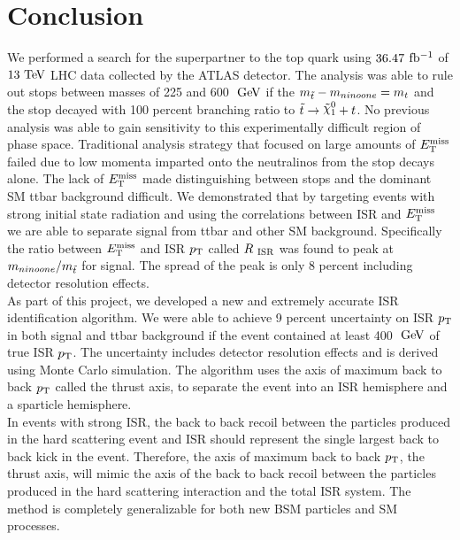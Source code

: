\chapter{Conclusion}
\label{conclusion}

\indent We performed a search for the superpartner to the top quark using $36.47$ $\mbox{fb$^{-1}$}$ of $13 \tev$ LHC data collected by the ATLAS detector.   The analysis was able to rule out stops between masses of 225 and 600 $\gev$ if the $m_{\tilde{t}} - m_{ninoone} = m_{t}$ and the stop decayed with 100 percent branching ratio to $\stop \rightarrow \ninoone + t$.   No previous analysis was able to gain sensitivity to this experimentally difficult region of phase space.  Traditional analysis strategy that focused on large amounts of $E_{\mathrm{T}}^{\mathrm{miss}}$ failed due to low momenta imparted onto the neutralinos from the stop decays alone.  The lack of $E_{\mathrm{T}}^{\mathrm{miss}}$ made distinguishing between stops and the dominant SM ttbar background difficult.  We demonstrated that by targeting events with strong initial state radiation and using the correlations between ISR and $E_{\mathrm{T}}^{\mathrm{miss}}$ we are able to separate signal from ttbar and other SM background.  Specifically the ratio between $E_{\mathrm{T}}^{\mathrm{miss}}$ and ISR $p_{\mathrm{T}}$ called $R_{~\mathrm{ISR}}$ was found to peak at $m_{ninoone}/m_{\tilde{t}}$ for signal.  The spread of the peak is only 8 percent including detector resolution effects.  \\

\indent As part of this project, we developed a new and extremely accurate ISR identification algorithm.  We were able to achieve 9 percent uncertainty on ISR $p_{\mathrm{T}}$ in both signal and ttbar background if the event contained at least 400 $\gev$ of true ISR $p_{\mathrm{T}}$.  The uncertainty includes detector resolution effects and is derived using Monte Carlo simulation.  The algorithm uses the axis of maximum back to back $p_{\mathrm{T}}$ called the thrust axis, to separate the event into an ISR hemisphere and a sparticle hemisphere.  \\

\indent In events with strong ISR, the back to back recoil between the particles produced in the hard scattering event and ISR should represent the single largest back to back kick in the event.  Therefore, the axis of maximum back to back $p_{\mathrm{T}}$, the thrust axis, will mimic the axis of the back to back recoil between the particles produced in the hard scattering interaction and the total ISR system.  The method is completely generalizable for both new BSM particles and SM processes. \\ %

